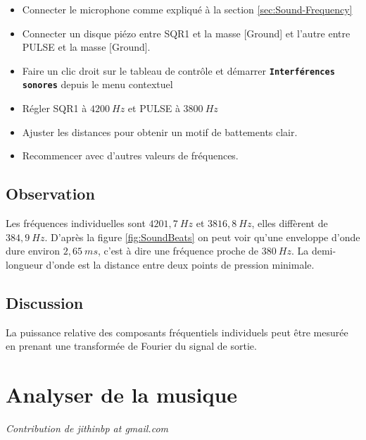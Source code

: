 \documentclass{book}
\newcommand{\nop}{}
\begin{document}
\begin{itemize}
  \item Connecter le microphone comme expliqué à la section  \ref{sec:Sound-Frequency}
  \item Connecter un disque piézo entre SQR1 et la masse [Ground] et l'autre entre PULSE et la masse [Ground].
  \item Faire un clic droit sur le tableau de contrôle et démarrer  \texttt{\textbf{Interférences sonores}\nop} depuis le menu contextuel
  \item Régler SQR1 à $4200\ Hz$ et PULSE à $3800\ Hz$
  \item Ajuster les distances pour obtenir un motif de battements clair.
  \item Recommencer avec d'autres valeurs de fréquences.
\end{itemize}

\subsection{Observation}


Les fréquences individuelles sont $4201,7\ Hz$ et $3816,8\ Hz$, elles diffèrent de $384,9\ Hz$. D'après la figure  \ref{fig:SoundBeats} on peut voir qu'une enveloppe d'onde dure environ $2,65\ ms$, c'est à dire une fréquence proche de $380\ Hz$. La demi-longueur d'onde est la distance entre deux points de pression minimale.

\subsection{Discussion}


La puissance relative des composants fréquentiels individuels peut être mesurée en prenant une transformée de Fourier du signal de sortie.







\section{Analyser de la musique}


\emph{Contribution de jithinbp at gmail.com}
\end{document}
